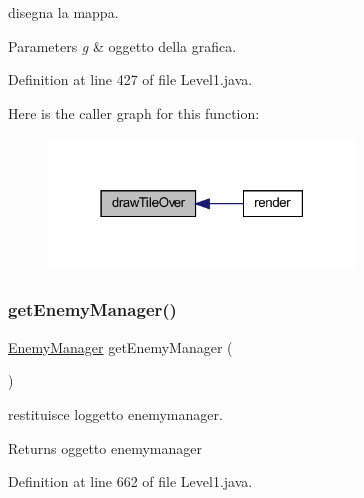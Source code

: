disegna la mappa. 


\begin{DoxyParams}{Parameters}
{\em g} & oggetto della grafica. \\
\hline
\end{DoxyParams}


Definition at line 427 of file Level1.\+java.

Here is the caller graph for this function\+:\nopagebreak
\begin{figure}[H]
\begin{center}
\leavevmode
\includegraphics[width=231pt]{classscenes_1_1_level1_ac299bbbbb70f97ae032c1345d5937378_icgraph}
\end{center}
\end{figure}
\mbox{\label{classscenes_1_1_level1_afdfe86992bb21f6ad2d9aea028b7896a}} 
\subsubsection{\texorpdfstring{get\+Enemy\+Manager()}{getEnemyManager()}}
{\footnotesize\ttfamily \hyperlink{classmanagers_1_1_enemy_manager}{Enemy\+Manager} get\+Enemy\+Manager (\begin{DoxyParamCaption}{ }\end{DoxyParamCaption})}



restituisce l\textquotesingle{}oggetto enemymanager. 

\begin{DoxyReturn}{Returns}
oggetto enemymanager 
\end{DoxyReturn}


Definition at line 662 of file Level1.\+java.

\mbox{\label{classscenes_1_1_level1_af5e9f906de91e4d6400bb7f27cd563f3}} 
